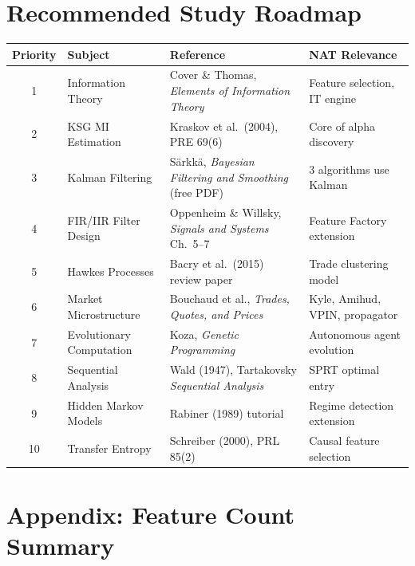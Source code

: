 \documentclass[11pt,a4paper]{article}
\begin{document}
\newpage
\section{Recommended Study Roadmap}

\begin{center}
\begin{longtable}{c l p{5cm} p{3cm}}
\hline
\textbf{Priority} & \textbf{Subject} & \textbf{Reference} & \textbf{NAT Relevance} \\
\hline
\endhead
1 & Information Theory & Cover \& Thomas, \textit{Elements of Information Theory} & Feature selection, IT engine \\
2 & KSG MI Estimation & Kraskov et al.\ (2004), PRE 69(6) & Core of alpha discovery \\
3 & Kalman Filtering & S\"arkk\"a, \textit{Bayesian Filtering and Smoothing} (free PDF) & 3 algorithms use Kalman \\
4 & FIR/IIR Filter Design & Oppenheim \& Willsky, \textit{Signals and Systems} Ch.\ 5--7 & Feature Factory extension \\
5 & Hawkes Processes & Bacry et al.\ (2015) review paper & Trade clustering model \\
6 & Market Microstructure & Bouchaud et al., \textit{Trades, Quotes, and Prices} & Kyle, Amihud, VPIN, propagator \\
7 & Evolutionary Computation & Koza, \textit{Genetic Programming} & Autonomous agent evolution \\
8 & Sequential Analysis & Wald (1947), Tartakovsky \textit{Sequential Analysis} & SPRT optimal entry \\
9 & Hidden Markov Models & Rabiner (1989) tutorial & Regime detection extension \\
10 & Transfer Entropy & Schreiber (2000), PRL 85(2) & Causal feature selection \\
\hline
\end{longtable}
\end{center}

\newpage
\section*{Appendix: Feature Count Summary}
\end{document}
